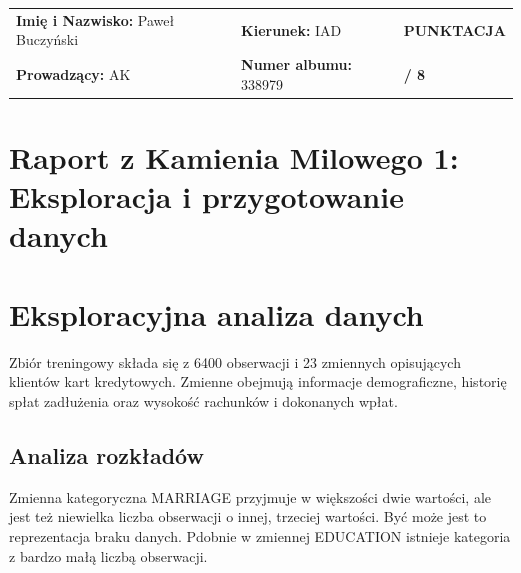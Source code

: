 \documentclass[a4paper,10pt]{article}
\begin{document}
\vspace{-1em}
\noindent
\renewcommand{\arraystretch}{1.3}
\begin{tabularx}{\textwidth}{|>{\hsize=1.2\hsize}X|>{\hsize=0.8\hsize}X|>{\centering\arraybackslash}m{2.5cm}|}
\hline
\rowcolor{tableheader}


\textbf{Imię i Nazwisko:} Paweł Buczyński %
& \textbf{Kierunek:} IAD %
& \cellcolor{scorebg}\textbf{PUNKTACJA} \\
\rowcolor{tableheader}
\textbf{Prowadzący:}  AK %
& \textbf{Numer albumu:} 338979 %
& \cellcolor{scorebg}\huge{\textbf{ / 8}} \\
\hline
\end{tabularx}
\renewcommand{\arraystretch}{1.0}

\vspace{-1em}


\section*{\color{primaryblue}Raport z Kamienia Milowego 1: Eksploracja i przygotowanie danych}



\section{Eksploracyjna analiza danych}

Zbiór treningowy składa się z 6400 obserwacji i 23 zmiennych opisujących klientów kart kredytowych. Zmienne obejmują informacje demograficzne, historię spłat zadłużenia oraz wysokość rachunków i dokonanych wpłat.

\subsection{Analiza rozkładów}

Zmienna kategoryczna MARRIAGE przyjmuje w większości dwie wartości, ale jest też niewielka liczba obserwacji o innej, trzeciej wartości.
Być może jest to reprezentacja braku danych.
Pdobnie w zmiennej EDUCATION istnieje kategoria z bardzo małą liczbą obserwacji.
\end{document}
